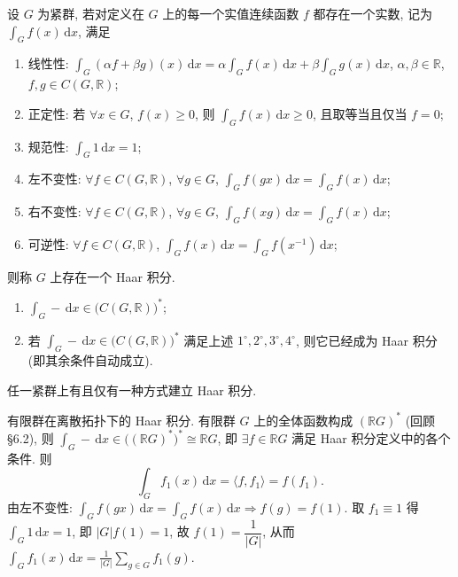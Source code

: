\begin{definition}[Haar 积分]\label{def:haar}
设 $G$ 为紧群, 若对定义在 $G$ 上的每一个实值连续函数 $f$ 都存在一个实数, 记为
$\int_G f(x)\,\mathrm{d}x$, 满足
\begin{enumerate}
  \item 线性性: $\displaystyle\int_G(\alpha f+\beta g)(x)\,\mathrm{d}x
        =\alpha\int_G f(x)\,\mathrm{d}x+\beta\int_G g(x)\,\mathrm{d}x$,
        $\alpha,\beta\in\mathbb{R}$, $f,g\in C(G,\mathbb{R})$;
  \item 正定性: 若 $\forall x\in G$, $f(x)\ge0$, 则 $\displaystyle\int_G f(x)\,\mathrm{d}x\ge0$,
        且取等当且仅当 $f=0$;
  \item 规范性: $\displaystyle\int_G 1\,\mathrm{d}x=1$;
  \item 左不变性: $\forall f\in C(G,\mathbb{R})$, $\forall g\in G$,
        $\displaystyle\int_G f(gx)\,\mathrm{d}x=\int_G f(x)\,\mathrm{d}x$;
  \item 右不变性: $\forall f\in C(G,\mathbb{R})$, $\forall g\in G$,
        $\displaystyle\int_G f(xg)\,\mathrm{d}x=\int_G f(x)\,\mathrm{d}x$;
  \item 可逆性: $\forall f\in C(G,\mathbb{R})$, $\displaystyle\int_G f(x)\,\mathrm{d}x
        =\int_G f(x^{-1})\,\mathrm{d}x$;
\end{enumerate}
则称 $G$ 上存在一个 Haar 积分.
\end{definition}

\begin{remark}\label{rem:haar-integral-axioms}
\mbox{}\par\vspace{-0.2em}
\begin{enumerate}
  \item $\displaystyle\int_G -\,\mathrm{d}x\in\bigl(C(G,\mathbb{R})\bigr)^*$;
  \item 若 $\displaystyle\int_G-\,\mathrm{d}x\in\bigl(C(G,\mathbb{R})\bigr)^*$ 满足上述
        $1^\circ,2^\circ,3^\circ,4^\circ$, 则它已经成为 Haar 积分 (即其余条件自动成立).
\end{enumerate}
\end{remark}

\begin{theorem}[Haar]\label{thm:haar-existence}
任一紧群上有且仅有一种方式建立 Haar 积分.
\end{theorem}

\begin{example}\label{ex:haar-finite}
有限群在离散拓扑下的 Haar 积分.
  有限群 $G$ 上的全体函数构成 $(\mathbb{R}G)^*$ (回顾 \S 6.2), 则
  $\int_G-\,\mathrm{d}x\in\bigl((\mathbb{R}G)^*\bigr)^*\cong\mathbb{R}G$,
  即 $\exists f\in\mathbb{R}G$ 满足 Haar 积分定义中的各个条件. 则
  \[
    \int_G f_1(x)\,\mathrm{d}x=\langle f,f_1\rangle=f(f_1).
  \]
  由左不变性: $\displaystyle\int_G f(gx)\,\mathrm{d}x=\int_G f(x)\,\mathrm{d}x
  \Longrightarrow f(g)=f(1)$.
  取 $f_1\equiv1$ 得 $\displaystyle\int_G1\,\mathrm{d}x=1$, 即 $|G|f(1)=1$,
  故 $f(1)=\dfrac1{|G|}$, 从而 $\displaystyle\int_Gf_1(x)\,\mathrm{d}x=\frac1{|G|}\sum_{g\in G}f_1(g)$.
\end{example}

